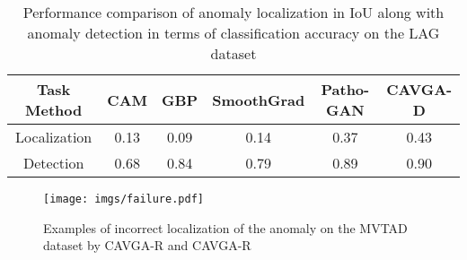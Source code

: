 \documentclass[runningheads]{llncs}
\begin{document}
\begin{table}[h!]
\begin{center}
\setlength{\tabcolsep}{2.0pt}
\scriptsize
\caption{Performance comparison of anomaly localization in IoU along with anomaly detection in terms of classification accuracy on the LAG dataset \cite{Li_2019_CVPR}
}
\label{table_lag}
\begin{tabular}{cccccc}
\toprule
		  Task  Method   & CAM \cite{zhou2016learning} & GBP \cite{springenberg2014striving}  &SmoothGrad \cite{smilkov2017smoothgrad} & Patho-GAN \cite{wang2019pathology} &CAVGA-D\\
		  
\midrule
		 Localization   &\cellcolor{blue!20}0.13 &\cellcolor{blue!5}0.09  &\cellcolor{blue!40}0.14 &\cellcolor{blue!60}0.37  &\cellcolor{blue!80} \color{white}0.43 \\ 
		 Detection      &\cellcolor{blue!5}0.68  &\cellcolor{blue!40}0.84   &\cellcolor{blue!20}0.79  &\cellcolor{blue!60}0.89  &\cellcolor{blue!80} \color{white}0.90 \\ 
\bottomrule
\end{tabular}
\end{center}
\end{table}

\begin{figure}[h!]
\centering
\texttt{[image: imgs/failure.pdf]}
\caption{
Examples of incorrect localization of the anomaly on the MVTAD dataset by CAVGA-R and CAVGA-R
}
\label{qual_failure}

\end{figure}
\end{document}
